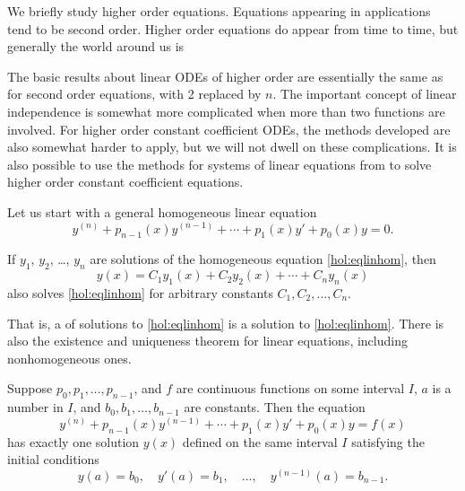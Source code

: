 
%

We briefly study higher order equations.
Equations appearing in applications tend to be second
order.  Higher order equations do appear from time to time, but
generally the world around us is   

The basic results about linear ODEs of higher order are essentially 
the same as for second order equations, with 2 replaced by $n$.
The important concept
of linear independence is somewhat more complicated when more than two
functions are involved.
For higher order constant coefficient ODEs, the methods developed are also
somewhat harder to apply,
but we will not dwell on these complications.
It is also possible to use the methods for systems
of linear equations from  to solve higher order
constant coefficient equations.

Let us start with a general homogeneous linear equation
\begin{equation} \label{hol:eqlinhom}
y^{(n)} + p_{n-1}(x)y^{(n-1)} + \cdots + p_1(x) y' + p_0(x) y = 0 .
\end{equation}

\begin{theorem}[Superposition]
If $y_1$, $y_2$, \ldots, $y_n$ are solutions of the
homogeneous equation \eqref{hol:eqlinhom}, then 
\begin{equation*}
y(x) = C_1 y_1(x) + C_2 y_2(x) + \cdots + C_n y_n(x) 
\end{equation*}
also solves \eqref{hol:eqlinhom}
for arbitrary constants $C_1, C_2, \ldots, C_n$.
\end{theorem}

That is, a \emph{} of solutions
to \eqref{hol:eqlinhom}
is a solution to \eqref{hol:eqlinhom}.
There is also the existence and uniqueness theorem for linear
equations, including nonhomogeneous ones.

\begin{theorem}
Suppose $p_0, p_1, \ldots, p_{n-1}$, and $f$ are continuous functions
on some interval $I$,
$a$ is a number in $I$,
and $b_0, b_1, \ldots, b_{n-1}$ are constants.
Then the equation
\begin{equation*} %
y^{(n)} + p_{n-1}(x)y^{(n-1)} + \cdots + p_1(x) y' + p_0(x) y = f(x) 
\end{equation*}
has exactly one solution $y(x)$ defined on the same interval $I$
satisfying the initial conditions
\begin{equation*}
y(a) = b_0, \quad y'(a) = b_1, \quad \ldots, \quad y^{(n-1)}(a) = b_{n-1} .
\end{equation*}
\end{theorem}

